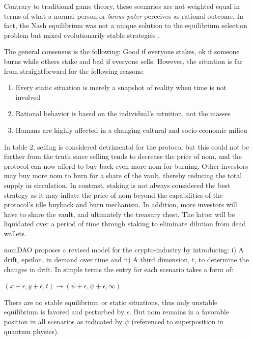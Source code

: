 \documentclass[12pt]{article}
\begin{document}
Contrary to traditional game theory, these scenarios are not weighted equal in terms of what a normal person or \textit{bonus pater} perceives as rational outcome. In fact, the Nash equilibrium was not a unique solution to the equilibrium selection problem but mixed evolutionarily stable strategies \cite{evogame}.

The general consensus is the following: Good if everyone stakes, ok if someone burns while others stake and bad if everyone sells. However, the situation is far from straightforward for the following reasons:

\begin{enumerate}[label=(\roman*)]

\item Every static situation is merely a snapshot of reality when time is not involved

\item  Rational behavior is based on the individual’s intuition, not the masses

\item  Humans are highly affected in a changing cultural and socio-economic milieu

\end{enumerate}

In table 2, selling is considered detrimental for the protocol but this could not be further from the truth since selling tends to decrease the price of nom, and the protocol can now afford to buy back even more nom for burning. Other investors may buy more nom to burn for a share of the vault, thereby reducing the total supply in circulation. In contrast, staking is not always considered the best strategy as it may inflate the price of nom beyond the capabilities of the protocol’s idle buyback and burn mechanism. In addition, more investors will have to share the vault, and ultimately the treasury chest. The latter will be liquidated over a period of time through staking to eliminate dilution from dead wallets.

nomDAO proposes a revised model for the crypto-industry by introducing: i) A drift, epsilon, in demand over time and ii) A third dimension, t, to determine the changes in drift. In simple terms the entry for each scenario takes a form of: 

$(x+\epsilon, y+ \epsilon, t) \rightarrow (\psi+\epsilon, \psi+ \epsilon, \infty)$

There are no stable equilibrium or static situations, thus only unstable equilibrium is favored and perturbed by $\epsilon$. But nom remains in a favorable position in all scenarios as indicated by $\psi$ (referenced to superposition in quantum physics). \\
\end{document}
